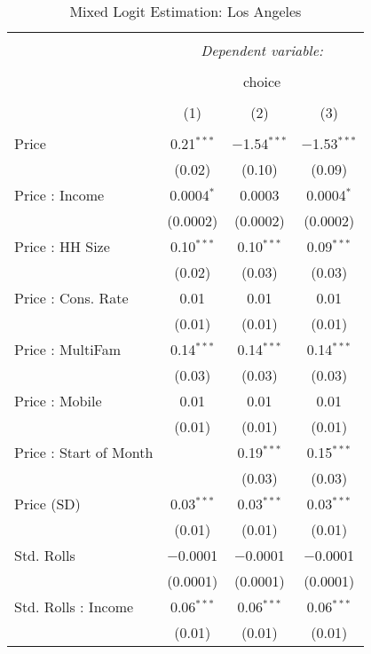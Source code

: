 
\begin{table}[!htbp] \centering 
  \caption{Mixed Logit Estimation: Los Angeles} 
  \label{tab:mnlLos AngelesRandCoef} 
\begin{tabular}{@{\extracolsep{5pt}}lccc} 
\\[-1.8ex]\hline 
\hline \\[-1.8ex] 
 & \multicolumn{3}{c}{\textit{Dependent variable:}} \\ 
\cline{2-4} 
\\[-1.8ex] & \multicolumn{3}{c}{choice} \\ 
\\[-1.8ex] & (1) & (2) & (3)\\ 
\hline \\[-1.8ex] 
 Price & 0.21$^{***}$ & $-$1.54$^{***}$ & $-$1.53$^{***}$ \\ 
  & (0.02) & (0.10) & (0.09) \\ 
  Price : Income & 0.0004$^{*}$ & 0.0003 & 0.0004$^{*}$ \\ 
  & (0.0002) & (0.0002) & (0.0002) \\ 
  Price : HH Size & 0.10$^{***}$ & 0.10$^{***}$ & 0.09$^{***}$ \\ 
  & (0.02) & (0.03) & (0.03) \\ 
  Price : Cons. Rate & 0.01 & 0.01 & 0.01 \\ 
  & (0.01) & (0.01) & (0.01) \\ 
  Price : MultiFam & 0.14$^{***}$ & 0.14$^{***}$ & 0.14$^{***}$ \\ 
  & (0.03) & (0.03) & (0.03) \\ 
  Price : Mobile & 0.01 & 0.01 & 0.01 \\ 
  & (0.01) & (0.01) & (0.01) \\ 
  Price : Start of Month &  & 0.19$^{***}$ & 0.15$^{***}$ \\ 
  &  & (0.03) & (0.03) \\ 
  Price (SD) & 0.03$^{***}$ & 0.03$^{***}$ & 0.03$^{***}$ \\ 
  & (0.01) & (0.01) & (0.01) \\ 
  Std. Rolls & $-$0.0001 & $-$0.0001 & $-$0.0001 \\ 
  & (0.0001) & (0.0001) & (0.0001) \\ 
  Std. Rolls : Income & 0.06$^{***}$ & 0.06$^{***}$ & 0.06$^{***}$ \\ 
  & (0.01) & (0.01) & (0.01) \\ 

\end{tabular}
\end{table}
